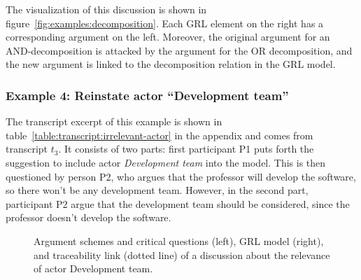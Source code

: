 The visualization of this discussion is shown in figure~\ref{fig:examples:decomposition}. Each GRL element on the right has a corresponding argument on the left. Moreover, the original argument for an AND-decomposition is attacked by the argument for the OR decomposition, and the new argument is linked to the decomposition relation in the GRL model.

\subsubsection{Example 4: Reinstate actor ``Development team''}

The transcript excerpt of this example is shown in table~\ref{table:transcript:irrelevant-actor} in the appendix and comes from transcript $t_3$. It consists of two parts: first participant P1 puts forth the suggestion to include actor \emph{Development team} into the model. This is then questioned by person P2, who argues that the professor will develop the software, so there won't be any development team. However, in the second part, participant P2 argue that the development team should be considered, since the professor doesn't develop the software.

\begin{figure}[ht!]
\centering
\caption{Argument schemes and critical questions (left), GRL model (right), and traceability link (dotted line) of a discussion about the relevance of actor Development team.}
\label{fig:examples:relevant-actor}
\end{figure}

